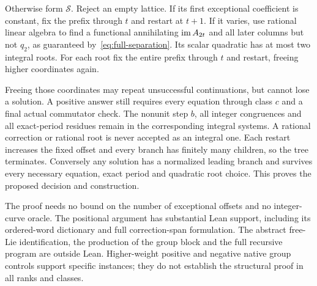 Otherwise form $\mathcal S$. Reject an empty lattice. If its first
exceptional coefficient is constant, fix the prefix through $t$ and
restart at $t+1$. If it varies, use rational linear algebra to find a
functional annihilating $\operatorname{im} A_{2t}$ and all later columns but not
$q_2$, as guaranteed by~\eqref{eq:full-separation}. Its scalar
quadratic has at most two integral roots. For each root fix the entire
prefix through $t$ and restart, freeing higher coordinates again.

Freeing those coordinates may repeat unsuccessful continuations, but
cannot lose a solution. A positive answer still requires every equation
through class $c$ and a final actual commutator check. The nonunit step
$b$, all integer congruences and all exact-period residues remain in
the corresponding integral systems. A rational correction or rational
root is never accepted as an integral one. Each restart increases the
fixed offset and every branch has finitely many children, so the tree
terminates. Conversely any solution has a normalized leading branch
and survives every necessary equation, exact period and quadratic root
choice. This proves the proposed decision and construction.

The proof needs no bound on the number of exceptional offsets and no
integer-curve oracle. The positional argument has substantial Lean
support, including its ordered-word dictionary and full correction-span
formulation. The abstract free-Lie identification, the production of
the group block and the full recursive program are outside Lean.
Higher-weight positive and negative native group controls support
specific instances; they do not establish the structural proof in
all ranks and classes.

